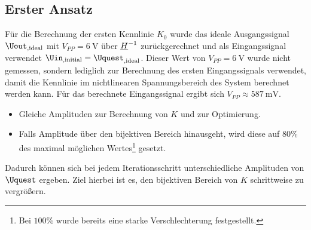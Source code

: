 \documentclass[../Report.tex]{subfiles}
\begin{document}
\subsection{Erster Ansatz}
\label{subsec:opt.adjusta.results}
Für die Berechnung der ersten Kennlinie $K_0$ wurde das ideale Ausgangssignal $\Uout_{, \mathrm{ideal}}$ mit $V_{PP} = \SI{6}{\V}$ über $\underline{H}^{-1}$ zurückgerechnet und als Eingangssignal verwendet $\Uin_{, \mathrm{initial }} = \Uquest_{, \mathrm{ideal}}$. Dieser Wert von $V_{PP} = \SI{6}{\V}$ wurde nicht gemessen, sondern lediglich zur Berechnung des ersten Eingangssignals verwendet, damit die Kennlinie im nichtlinearen Spannungsbereich des System berechnet werden kann. Für das berechnete Eingangssignal ergibt sich $V_{PP} \approx \SI{587}{\mV}$.\\
\begin{itemize}
	\item 	Gleiche Amplituden zur Berechnung von $K$ und zur Optimierung.
	
	\item 	Falls Amplitude über den bijektiven Bereich hinausgeht, wird diese auf $80 \%$ des maximal möglichen Wertes\footnote{Bei $100 \%$ wurde bereits eine starke Verschlechterung festgestellt.} gesetzt.
	
\end{itemize}
Dadurch können sich bei jedem Iterationsschritt unterschiedliche Amplituden von $\Uquest$ ergeben. Ziel hierbei ist es, den bijektiven Bereich von $K$ schrittweise zu vergrößern.
\end{document}
